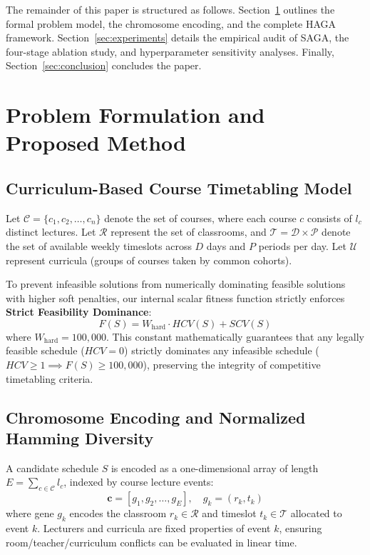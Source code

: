 \documentclass[journal]{IEEEtran}
\begin{document}
The remainder of this paper is structured as follows. Section~\ref{sec:method} outlines the formal problem model, the chromosome encoding, and the complete HAGA framework. Section~\ref{sec:experiments} details the empirical audit of SAGA, the four-stage ablation study, and hyperparameter sensitivity analyses. Finally, Section~\ref{sec:conclusion} concludes the paper.

\section{Problem Formulation and Proposed Method}
\label{sec:method}

\subsection{Curriculum-Based Course Timetabling Model}
Let $\mathcal{C} = \{c_1, c_2, \dots, c_n\}$ denote the set of courses, where each course $c$ consists of $l_c$ distinct lectures. Let $\mathcal{R}$ represent the set of classrooms, and $\mathcal{T} = \mathcal{D} \times \mathcal{P}$ denote the set of available weekly timeslots across $D$ days and $P$ periods per day. Let $\mathcal{U}$ represent curricula (groups of courses taken by common cohorts).

To prevent infeasible solutions from numerically dominating feasible solutions with higher soft penalties, our internal scalar fitness function strictly enforces \textbf{Strict Feasibility Dominance}:
\begin{equation}
F(S) = W_{\text{hard}} \cdot HCV(S) + SCV(S)
\end{equation}
where $W_{\text{hard}} = 100,000$. This constant mathematically guarantees that any legally feasible schedule ($HCV = 0$) strictly dominates any infeasible schedule ($HCV \ge 1 \implies F(S) \ge 100,000$), preserving the integrity of competitive timetabling criteria.

\subsection{Chromosome Encoding and Normalized Hamming Diversity}
A candidate schedule $S$ is encoded as a one-dimensional array of length $E = \sum_{c \in \mathcal{C}} l_c$, indexed by course lecture events:
\begin{equation}
\mathbf{c} = [g_1, g_2, \dots, g_E], \quad g_k = (r_k, t_k)
\end{equation}
where gene $g_k$ encodes the classroom $r_k \in \mathcal{R}$ and timeslot $t_k \in \mathcal{T}$ allocated to event $k$. Lecturers and curricula are fixed properties of event $k$, ensuring room/teacher/curriculum conflicts can be evaluated in linear time.
\end{document}
